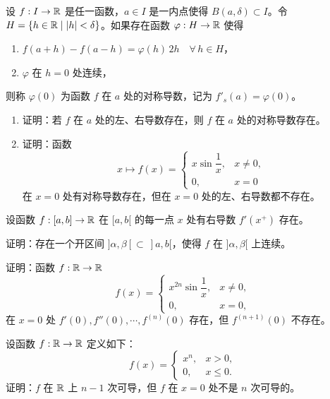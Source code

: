 \begin{exercise}
	\item 设 \(f:I\to\mathbb{R}\) 是任一函数，\(a\in I\) 是一内点使得 \(B(a,\delta)\subset I\)。令 \(H=\{h\in\mathbb{R}\mid|h|<\delta\}\)。如果存在函数 \(\varphi:H\to\mathbb{R}\) 使得
	\begin{enumerate}[label=\arabic*)]
		\item \(f(a+h)-f(a-h)=\varphi(h)\,2h\quad\forall\,h\in H\)，
		\item \(\varphi\) 在 \(h=0\) 处连续，
	\end{enumerate}
	则称 \(\varphi(0)\) 为函数 \(f\) 在 \(a\) 处的对称导数，记为 \(f'_s(a)=\varphi(0)\)。
	\begin{enumerate}[label=\arabic*)]
		\item 证明：若 \(f\) 在 \(a\) 处的左、右导数存在，则 \(f\) 在 \(a\) 处的对称导数存在。
		\item 证明：函数
		\[
		x\longmapsto f(x)=\begin{cases} x\sin\dfrac1x, & x\neq0, \\ 0, & x=0 \end{cases}
		\]
		在 \(x=0\) 处有对称导数存在，但在 \(x=0\) 处的左、右导数都不存在。
	\end{enumerate}
\end{exercise}

\begin{exercise}
	\item 设函数 \(f:[a,b]\to\mathbb{R}\) 在 \([a,b[\) 的每一点 \(x\) 处有右导数 \(f'(x^+)\) 存在。

	证明：存在一个开区间 \(]\alpha,\beta[\subset\ ]a,b[\)，使得 \(f\) 在 \(]\alpha,\beta[\) 上连续。
\end{exercise}

\begin{exercise}
	\item 证明：函数 \(f:\mathbb{R}\to\mathbb{R}\)
	\[
	f(x)=\begin{cases} x^{2n}\sin\dfrac1x, & x\neq0, \\ 0, & x=0, \end{cases}
	\]
	在 \(x=0\) 处 \(f'(0),f''(0),\cdots,f^{(n)}(0)\) 存在，但 \(f^{(n+1)}(0)\) 不存在。
\end{exercise}

\begin{exercise}
	\item 设函数 \(f:\mathbb{R}\to\mathbb{R}\) 定义如下：
	\[
	f(x)=\begin{cases} x^n, & x>0, \\ 0, & x\le0. \end{cases}
	\]
	证明：\(f\) 在 \(\mathbb{R}\) 上 \(n-1\) 次可导，但 \(f\) 在 \(x=0\) 处不是 \(n\) 次可导的。
\end{exercise}

